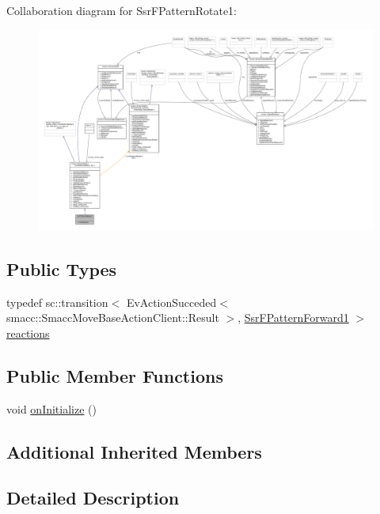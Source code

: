 Collaboration diagram for Ssr\+F\+Pattern\+Rotate1\+:
\nopagebreak
\begin{figure}[H]
\begin{center}
\leavevmode
\includegraphics[width=350pt]{structSsrFPatternRotate1__coll__graph}
\end{center}
\end{figure}
\subsection*{Public Types}
\begin{DoxyCompactItemize}
\item 
typedef sc\+::transition$<$ Ev\+Action\+Succeded$<$ smacc\+::\+Smacc\+Move\+Base\+Action\+Client\+::\+Result $>$, \hyperlink{structSsrFPatternForward1}{Ssr\+F\+Pattern\+Forward1} $>$ \hyperlink{structSsrFPatternRotate1_a3e6c3d2e990e069b2a8ebcc4d7796205}{reactions}
\end{DoxyCompactItemize}
\subsection*{Public Member Functions}
\begin{DoxyCompactItemize}
\item 
void \hyperlink{structSsrFPatternRotate1_aaf280a67edc0719088176780968dbc01}{on\+Initialize} ()
\end{DoxyCompactItemize}
\subsection*{Additional Inherited Members}


\subsection{Detailed Description}


